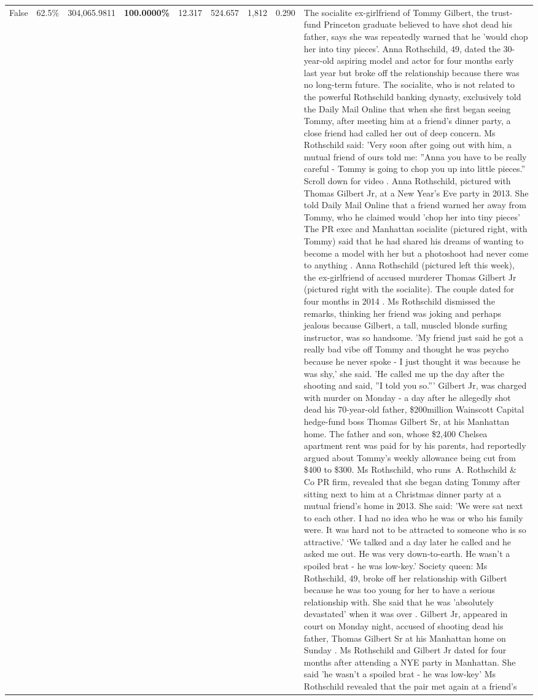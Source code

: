 \begin{table}[H]
\begin{tabular}{lllrlllll}
False & 62.5\% & \color{red} 304,065.9811 & \bfseries \color{red} 100.0000\% & 12.317 & 524.657 & 1,812 & 0.290 & The socialite ex-girlfriend of Tommy Gilbert, the trust-fund Princeton graduate believed to have shot dead his father, says she was repeatedly warned that he 'would chop her into tiny pieces'. Anna Rothschild, 49, dated the 30-year-old aspiring model and actor for four months early last year but broke off the relationship because there was no long-term future. The socialite, who is not related to the powerful Rothschild banking dynasty, exclusively told the Daily Mail Online that when she first began seeing Tommy, after meeting him at a friend's dinner party, a close friend had called her out of deep concern. Ms Rothschild said: 'Very soon after going out with him, a mutual friend of ours told me: ''Anna you have to be really careful - Tommy is going to chop you up into little pieces.'' Scroll down for video . Anna Rothschild, pictured with Thomas Gilbert Jr, at a New Year's Eve party in 2013. She told Daily Mail Online that a friend warned her away from Tommy, who he claimed would 'chop her into tiny pieces' The PR exec and Manhattan socialite (pictured right, with Tommy) said that he had shared his dreams of wanting to become a model with her but a photoshoot had never come to anything . Anna Rothschild (pictured left this week), the ex-girlfriend of accused murderer Thomas Gilbert Jr (pictured right with the socialite). The couple dated for four months in 2014 . Ms Rothschild dismissed the remarks, thinking her friend was joking and perhaps jealous because Gilbert, a tall, muscled blonde surfing instructor, was so handsome. 'My friend just said he got a really bad vibe off Tommy and thought he was psycho because he never spoke - I just thought it was because he was shy,' she said. 'He called me up the day after the shooting and said, ''I told you so.''' Gilbert Jr, was charged with murder on Monday - a day after he allegedly shot dead his 70-year-old father, \$200million Wainscott Capital hedge-fund boss Thomas Gilbert Sr, at his Manhattan home. The father and son, whose \$2,400 Chelsea apartment rent was paid for by his parents, had reportedly argued about Tommy's weekly allowance being cut from \$400 to \$300. Ms Rothschild, who runs A. Rothschild \& Co PR firm, revealed that she began dating Tommy after sitting next to him at a Christmas dinner party at a mutual friend's home in 2013. She said: 'We were sat next to each other. I had no idea who he was or who his family were. It was hard not to be attracted to someone who is so attractive.' ‘We talked and a day later he called and he asked me out. He was very down-to-earth. He wasn’t a spoiled brat - he was low-key.’ Society queen: Ms Rothschild, 49, broke off her relationship with Gilbert because he was too young for her to have a serious relationship with. She said that he was 'absolutely devastated' when it was over . Gilbert Jr, appeared in court on Monday night, accused of shooting dead his father, Thomas Gilbert Sr at his Manhattan home on Sunday . Ms Rothschild and Gilbert Jr dated for four months after attending a NYE party in Manhattan. She said 'he wasn't a spoiled brat - he was low-key' Ms Rothschild revealed that the pair met again at a friend’s 
\end{tabular}
\end{table}

